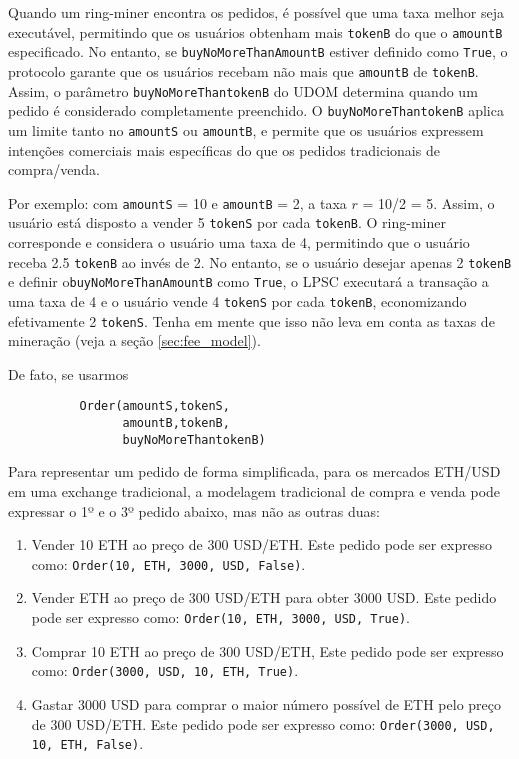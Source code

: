 \documentclass[UTF8,nofonts]{article}
\begin{document}
\begin{multicols}{2}
Quando um ring-miner encontra os pedidos, é possível que uma taxa melhor seja executável, permitindo que os usuários obtenham mais \verb|tokenB| do que o \verb|amountB| especificado. No entanto, se \verb|buyNoMoreThanAmountB| estiver definido como \verb|True|, o protocolo garante que os usuários recebam não mais que \verb|amountB| de \verb|tokenB|. Assim, o parâmetro \verb|buyNoMoreThantokenB| do UDOM determina quando um pedido é considerado completamente preenchido. O \verb|buyNoMoreThantokenB| aplica um limite tanto no \verb|amountS| ou \verb|amountB|, e permite que os usuários expressem intenções comerciais mais específicas do que os pedidos tradicionais de compra/venda.

Por exemplo: com \verb|amountS| = 10 e \verb|amountB| = 2, a taxa $r$ = 10/2 = 5.  Assim, o usuário está disposto a vender 5 \verb|tokenS| por cada \verb|tokenB|. O ring-miner corresponde e considera o usuário uma taxa de 4, permitindo que o usuário receba 2.5 \verb|tokenB| ao invés de 2. No entanto, se o usuário desejar apenas 2 \verb|tokenB| e definir o\verb|buyNoMoreThanAmountB| como  \verb|True|, o LPSC executará a transação a uma taxa de 4 e o usuário vende 4 \verb|tokenS| por cada \verb|tokenB|, economizando efetivamente 2 \verb|tokenS|. Tenha em mente que isso não leva em conta as taxas de mineração (veja a seção \ref{sec:fee_model}).

De fato, se usarmos


\begin{verbatim}
	      Order(amountS,tokenS,
	            amountB,tokenB,
	            buyNoMoreThantokenB)
\end{verbatim}

Para representar um pedido de forma simplificada, para os mercados ETH/USD em uma exchange tradicional, a modelagem tradicional de compra e venda pode expressar o 1º e o 3º pedido abaixo, mas não as outras duas:

\begin{enumerate}
	\item Vender 10 ETH ao preço de 300 USD/ETH. Este pedido pode ser expresso como: \verb|Order(10, ETH, 3000, USD, False)|.
	\item Vender ETH ao preço de 300 USD/ETH para obter 3000 USD. Este pedido pode ser expresso como: \verb|Order(10, ETH, 3000, USD, True)|.
	\item Comprar 10 ETH ao preço de 300 USD/ETH, Este pedido pode ser expresso como: \verb|Order(3000, USD, 10, ETH, True)|.
	\item Gastar 3000 USD para comprar o maior número possível de ETH pelo preço de 300 USD/ETH. Este pedido pode ser expresso como: \verb|Order(3000, USD, 10, ETH, False)|.
\end{enumerate}




\end{multicols}
\end{document}
